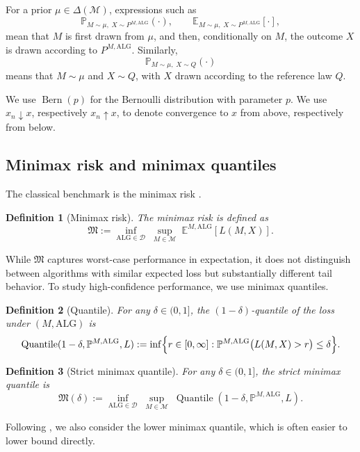\documentclass[journal]{IEEEtran}
\newtheorem{definition}{Definition}
\newcommand{\Bern}{\operatorname{Bern}}
\newcommand{\ALG}{\mathrm{ALG}}
\newcommand{\Quantile}{\operatorname{Quantile}}
\begin{document}
For a prior \(\mu\in\Delta(\mathcal M)\), expressions such as
\[
\mathbb P_{M\sim\mu,\;X\sim P^{M,\ALG}}(\cdot),
\qquad
\mathbb E_{M\sim\mu,\;X\sim P^{M,\ALG}}[\cdot],
\]
mean that \(M\) is first drawn from \(\mu\), and then, conditionally on
\(M\), the outcome \(X\) is drawn according to \(P^{M,\ALG}\). Similarly,
\[
\mathbb P_{M\sim\mu,\;X\sim Q}(\cdot)
\]
means that \(M\sim\mu\) and \(X\sim Q\), with \(X\) drawn according to the reference law \(Q\).

We use \(\Bern(p)\) for the Bernoulli distribution with parameter \(p\). We use
\(x_n\downarrow x\), respectively \(x_n\uparrow x\), to denote convergence to
\(x\) from above, respectively from below.

\subsection{Minimax risk and minimax quantiles}

The classical benchmark is the minimax risk \cite{polyanskiy2014lecture}.

\begin{definition}[Minimax risk]
The minimax risk is defined as
\[
\mathfrak M
:=
\inf_{\ALG\in\mathcal D}\;
\sup_{M\in\mathcal M}\;
\mathbb E^{M,\ALG}[L(M,X)].
\]
\end{definition}

While \(\mathfrak M\) captures worst-case performance in expectation, it does not distinguish between algorithms with similar expected loss but substantially different tail behavior. To study high-confidence performance, we use minimax quantiles.

\begin{definition}[Quantile]
For any \(\delta\in(0,1]\), the \((1-\delta)\)-quantile of the loss under \((M,\ALG)\) is
\[
\Quantile(1-\delta,\mathbb P^{M,\ALG},L)
:=
\inf\Bigl\{
r\in[0,\infty]:
\mathbb P^{M,\ALG}\bigl(L(M,X)>r\bigr)\le \delta
\Bigr\}.
\]
\end{definition}

\begin{definition}[Strict minimax quantile]
For any \(\delta\in(0,1]\), the strict minimax quantile is
\[
\mathfrak M(\delta)
:=
\inf_{\ALG\in\mathcal D}\;
\sup_{M\in\mathcal M}\;
\Quantile(1-\delta,\mathbb P^{M,\ALG},L).
\]
\end{definition}

Following \cite{ma2024high}, we also consider the lower minimax quantile, which is often easier to lower bound directly.
\end{document}

